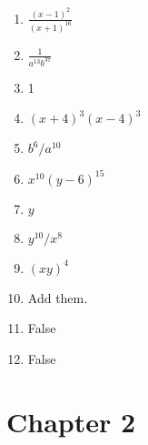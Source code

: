 \documentclass[a4paper]{JAC2003}
\begin{document}
\begin{enumerate}
\item  $\frac{(x-1)^{2}}{(x+1)^{16}}$

\item  $\frac{1}{a^{13} b^{37}}$

\item  1

\item  $(x+4)^{3}(x-4)^{3}$

\item  $b^{6} / a^{10}$

\item  $x^{10}(y-6)^{15}$

\item  $y$

\item  $y^{10} / x^{8}$

\item  $(x y)^{4}$

\item  Add them.

\item  False

\item  False
\end{enumerate}

\section{Chapter 2}
\end{document}
